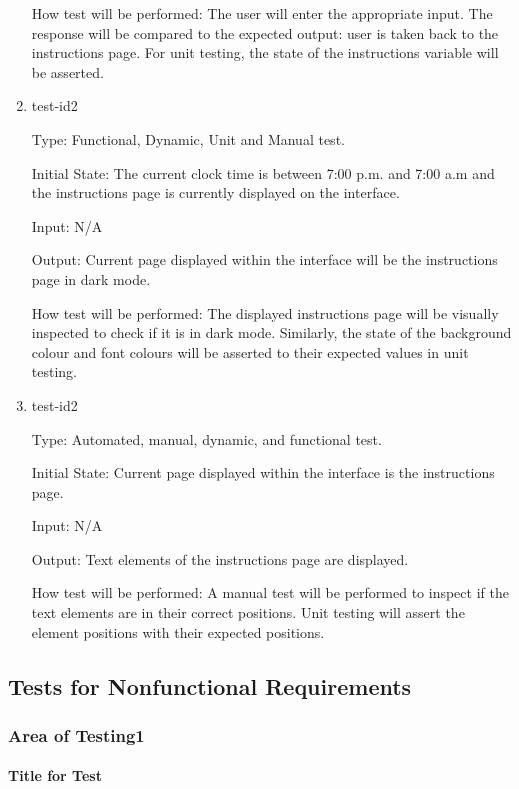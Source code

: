 \documentclass[12pt, titlepage]{article}
\begin{document}
\begin{enumerate}
How test will be performed: The user will enter the appropriate input. The response will be compared to the expected output: user is taken back to the instructions page. For unit testing, the state of the instructions variable will be asserted.


\item{test-id2\\}

Type: Functional, Dynamic, Unit and Manual test.
					
Initial State:  The current clock time is between 7:00 p.m. and 7:00 a.m and the instructions page is currently displayed on the interface.
					
Input: N/A
					
Output: Current page displayed within the interface will be the instructions page in dark mode.
					
How test will be performed: The displayed instructions page will be visually inspected to check if it is in dark mode. Similarly, the state of the background colour and font colours will be asserted to their expected values in unit testing. 



\item{test-id2\\}

Type: Automated, manual, dynamic, and functional test.
					
Initial State: Current page displayed within the interface is the instructions page.
					
Input: N/A
					
Output: Text elements of the instructions page are displayed.
					
How test will be performed: A manual test will be performed to inspect if the text elements are in their correct positions. Unit testing will assert the element positions with their expected positions. 

\end{enumerate}


\subsection{Tests for Nonfunctional Requirements}

\subsubsection{Area of Testing1}
		
\paragraph{Title for Test}
\end{document}
